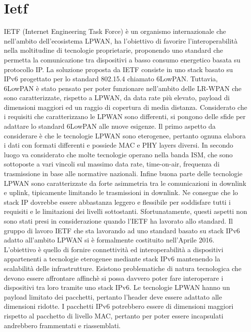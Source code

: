 \documentclass[12pt,a4paper,openright,twoside]{report}
\begin{document}
\section{Ietf}
IETF (Internet Engineering Task Force) \`e un organismo internazionale che nell'ambito dell'ecosistema LPWAN, ha l'obiettivo di favorire l'interoperabilit\`a nella moltitudine di tecnologie proprietarie, proponendo uno standard che permetta la comunicazione tra dispositivi a basso consumo energetico basata su protocollo IP.
La soluzione proposta da IETF consiste in uno stack basato su IPv6 progettato per lo standard 802.15.4 chiamato 6LowPAN. 
Tuttavia, 6LowPAN \`e stato pensato per poter funzionare nell'ambito delle LR-WPAN che sono caratterizzate, rispetto a LPWAN, da data rate pi\`u elevato, payload di dimensioni maggiori ed un raggio di copertura di media distanza. 
Considerato che i requisiti che caratterizzano le LPWAN sono differenti, si pongono delle sfide per adattare lo standard 6LowPAN alle nuove esigenze. 
Il primo aspetto da considerare \`e che le tecnologie LPWAN sono eterogenee, pertanto ognuna elabora i dati con formati differenti e possiede MAC e PHY layers diversi. 
In secondo luogo va considerato che molte tecnologie operano nella banda ISM, che sono sottoposte a vari vincoli sul massimo data rate, time-on-air, frequenza di trasmissione in base alle normative nazionali. 
Infine buona parte delle tecnologie LPWAN sono caratterizzate da forte asimmetria tra le comunicazioni in downlink e uplink, tipicamente limitando le trasmissioni in downlink. 
Ne consegue che lo stack IP dovrebbe essere abbastanza leggero e flessibile per soddisfare tutti i requisiti e le limitazioni dei livelli sottostanti. 
Sfortunatamente, questi aspetti non sono stati presi in considerazione quando l'IETF ha lavorato allo standard.
Il gruppo di lavoro IETF che sta lavorando ad uno standard basato su stack IPv6 adatto all'ambito LPWAN si \`e formalmente costituito nell'Aprile 2016. 
L'obiettivo \`e quello di fornire connettivit\`a ed interoperabilit\`a a dispositivi appartenenti a tecnologie eterogenee mediante stack IPv6 mantenendo la scalabilit\`a delle infrastrutture. 
Esistono problematiche di natura tecnologica che devono essere affrontare affinch\`e si possa davvero poter fare interoperare i dispositivi tra loro tramite uno stack IPv6.
Le tecnologie LPWAN hanno un payload limitato dei pacchetti, pertanto l'header deve essere adattato alle dimensioni ridotte.
I pacchetti IPv6 potrebbero essere di dimensioni maggiori rispetto al pacchetto di livello MAC, pertanto per poter essere incapsulati andrebbero frammentati e riassemblati. 
\end{document}
